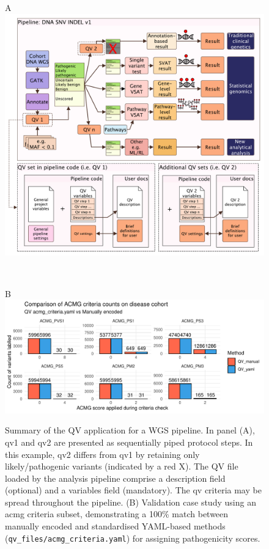 \begin{figure}[!h]
\centering
\begin{minipage}{0.85\textwidth}
\raggedright A\\[0.5ex]
\includegraphics[width=\textwidth]{./images/qv_pipeline_with_file_vcurrent.pdf}
\end{minipage}\\[-2ex]
\begin{minipage}{0.9\textwidth}
\raggedright B\\[0.5ex]
\includegraphics[width=\textwidth]{./images/Guru_singlecase_validation_of_yaml_vs_manual.pdf}
\end{minipage}
    \caption{Summary of the QV application for a WGS pipeline. In panel (A), \ac{qv}1 and \ac{qv}2 are presented as sequentially piped protocol steps. In this example, \ac{qv}2 differs from \ac{qv}1 by retaining only likely/pathogenic variants (indicated by a red X). The QV file loaded by the analysis pipeline comprise a description field (optional) and a variables field (mandatory). The \ac{qv} criteria may be spread throughout the pipeline.
    (B) Validation case study using an \ac{acmg} criteria subset, demonstrating a 100\% match between manually encoded and standardised YAML-based methods (\texttt{qv\_files/acmg\_criteria.yaml}) for assigning pathogenicity scores.}
    \label{fig:qv_pipeline_with_file_vcurrent_guru_case_study_result}
\end{figure}
